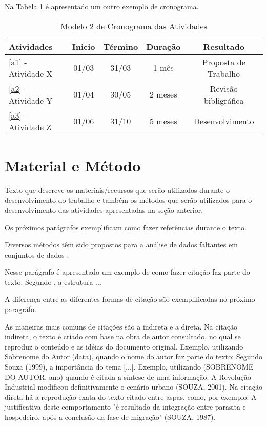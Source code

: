 \documentclass[
    12pt,               %
    a4paper,            %
    english,            %
    brazil,             %
    ]{article}
\begin{document}
 Na Tabela \ref{tabela:cronograma2} é apresentado um outro exemplo de cronograma.

 \begin{table}[ht]
    \scriptsize
    \centering
    \begin{tabular}{|l|c|c|c|c|} \hline
        \textbf{Atividades}     & Inicio  &Término      &Duração     &Resultado  \\ \hline \hline
        \ref{a1} - Atividade X  & 01/03   &31/03        & 1 mês      & Proposta de Trabalho \\ \hline
        \ref{a2} - Atividade Y  & 01/04   &30/05        & 2 meses    & Revisão bibligráfica  \\ \hline
        \ref{a3} - Atividade Z  & 01/06   &31/10        & 5 meses    & Desenvolvimento \\ \hline
    \end{tabular}
    \caption{Modelo 2 de Cronograma das Atividades}
    \label{tabela:cronograma2}
\end{table}


\section{Material e Método}

Texto que descreve os materiais/recursos que serão utilizados durante o desenvolvimento do trabalho
e também os métodos que serão utilizados para o desenvolvimento das atividades apresentadas na seção
anterior.

Os próximos  parágrafos exemplificam como fazer referências durante o texto.

Diversos métodos têm sido propostos para a análise de dados faltantes em conjuntos de dados \cite{williams2014}.

Nesse parágrafo é apresentado um exemplo de como fazer citação faz parte do texto. Segundo , a estrutura ...

A diferença entre as diferentes formas de citação são exemplificadas no próximo paragráfo.

As maneiras mais comuns de citações são a indireta e a direta. Na citação indireta, o texto é criado com base na obra de autor consultado,
no qual se reproduz o conteúdo e as idéias do documento original. Exemplo, utilizando Sobrenome do Autor (data), quando o nome do autor
faz parte do texto: Segundo Souza (1999), a importância do tema [...]. Exemplo, utilizando (SOBRENOME DO AUTOR, ano) quando é citada a
síntese de uma informação: A Revolução Industrial modificou definitivamente o cenário urbano (SOUZA, 2001). Na citação direta há a
reprodução exata do texto citado entre aspas, como, por exemplo: A justificativa deste comportamento "é resultado da integração entre
parasita e hospedeiro, após a conclusão da fase de migração" (SOUZA, 1987).
\end{document}

